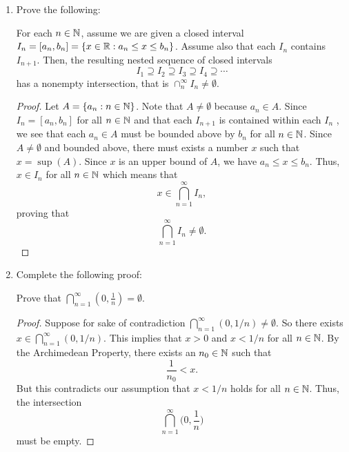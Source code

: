 \documentclass[11pt,a4paper]{article}
\begin{document}
\begin{enumerate}
\begin{enumerate}
\begin{proof}
            \end{proof}
    \end{enumerate}
    \item Prove the following:
        \begin{theorem}
            For each \( n \in \mathbb{N}  \), assume we are given a closed interval \( {I}_{n} = [{a}_{n}, {b}_{n}] = \{ x \in \mathbb{R} : {a}_{n} \leq x \leq {b}_{n} \}  \). Assume also that each \( {I}_{n} \) contains \( {I}_{n+1} \). Then, the resulting nested sequence of closed intervals
            \[  {I}_{1} \supseteq {I}_{2} \supseteq {I}_{3} \supseteq {I}_{4} \supseteq \cdots \]
            has a nonempty intersection, that is \( \cap_{n}^{\infty } {I}_{n} \neq \emptyset \).
        \end{theorem}
        \begin{proof}
            Let \( A = \{ {a}_{n} : n \in \mathbb{N}  \}  \). Note that \( A \neq \emptyset \) because \( {a}_{n} \in A  \). Since \( {I}_{n} = [{a}_{n}, {b}_{n}]  \) for all \( n \in \mathbb{N}  \) and that each \( {I}_{n+1} \) is contained within each \( {I}_{n} \) , we see that each \( {a}_{n} \in A  \) must be bounded above by \( {b}_{n} \) for all \( n \in \mathbb{N}  \). Since \( A \neq \emptyset  \) and bounded above, there must exists a number \( x  \) such that \( x = \sup(A) \). Since \( x  \) is an upper bound of \( A  \), we have \( {a}_{n} \leq x \leq {b}_{n}  \). Thus, \( x \in {I}_{n}  \) for all \( n \in \mathbb{N}  \) which means that  
            \[  x \in \bigcap_{ n=1  }^{ \infty  }  {I}_{n}, \]
            proving that 
            \[  \bigcap_{ n = 1  }^{ \infty  } {I}_{n} \neq \emptyset. \]
        \end{proof}
    \item Complete the following proof:

        Prove that \( \bigcap_{ n = 1  }^{ \infty  } (0, \frac{ 1 }{ n } ) = \emptyset \). 
        \begin{proof}
        Suppose for sake of contradiction \( \bigcap_{ n=1  }^{ \infty  } (  0, 1/n   ) \neq \emptyset  \). So there exists \( x \in \bigcap_{ n=1 }^{ \infty  } (0, 1/n) \). This implies that \( x > 0  \) and \( x < 1/n \) for all \( n \in \mathbb{N}  \). By the Archimedean Property, there exists an \( {n}_{0} \in \mathbb{N}  \) such that   
        \[  \frac{ 1 }{ {n}_{0} }  < x.   \]
        But this contradicts our assumption that \( x < 1 /n   \) holds for all \( n \in \mathbb{N}  \). Thus, the intersection
        \[  \bigcap_{ n=1  }^{ \infty  }  \Big(  0 , \frac{ 1 }{ n }  \Big)  \]
        must be empty.
        \end{proof}
\end{enumerate}
\end{document}
